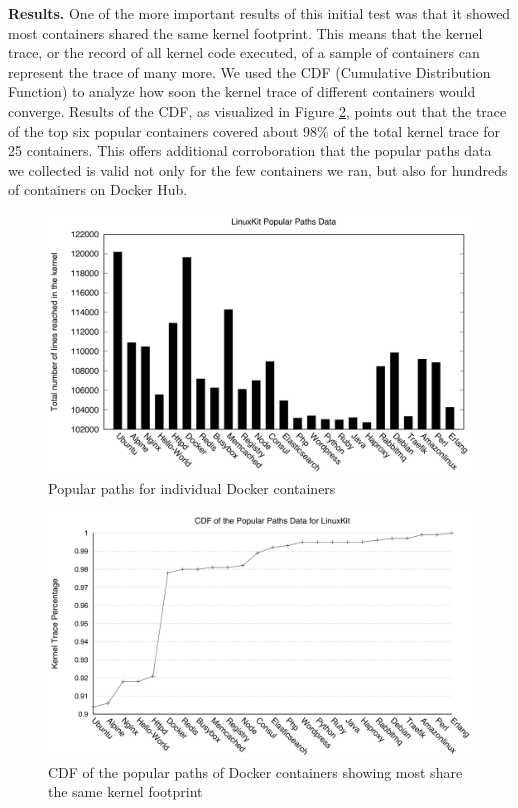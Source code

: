 \textbf{Results.}
One of the more important results of this initial test was that it showed most containers shared the same kernel footprint. 
This means that the kernel trace, or the record of all kernel code executed, of a sample of containers can represent the trace of many more. 
We used the CDF (Cumulative Distribution Function) to analyze how soon the kernel trace of different containers would converge. 
Results of the CDF, as visualized  in Figure \ref{fig:pp-cdf}, 
points out that the trace of the top six popular containers covered about 98\% of the total kernel trace for 25 containers. 
This offers additional corroboration that the popular paths data we collected is valid not only for the few containers we ran, but also for hundreds of containers on Docker Hub.  

\begin{figure}
\centering
\includegraphics[width=1.5\columnwidth]{diagram/pp-individuals.png}
\caption{\small Popular paths for individual Docker containers}
\label{fig:pp-individuals}
\end{figure}

\begin{figure}
\centering
\includegraphics[width=1.5\columnwidth]{diagram/pp-cdf.png}
\caption{\small CDF of the popular paths of Docker containers showing most share the same kernel footprint}
\label{fig:pp-cdf}
\end{figure}

